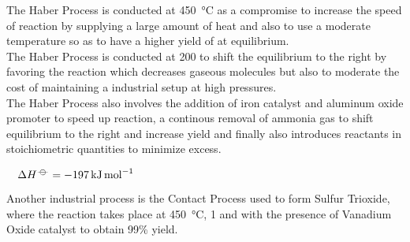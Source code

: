 \documentclass[../main]{subfiles}
\begin{document}
	The Haber Process is conducted at \SI{450}{\celsius} as a compromise to increase the speed of reaction by supplying a large amount of heat and also to use a moderate temperature so as to have a higher yield of  at equilibrium. \\

	The Haber Process is conducted at \SI{200}{\atm} to shift the equilibrium to the right by favoring the reaction which decreases gaseous molecules but also to moderate the cost of maintaining a industrial setup at high pressures. \\

	The Haber Process also involves the addition of iron catalyst and aluminum oxide promoter to speed up reaction, a continous removal of ammonia gas to shift equilibrium to the right and increase yield and finally also introduces reactants in stoichiometric quantities to minimize excess.

	\begin{center}  \(\quad \Delta H^\plimsoll = \SI{-197}{\kJ\per\mol}\) \end{center}

	Another industrial process is the Contact Process used to form Sulfur Trioxide, where the reaction takes place at \SI{450}{\celsius}, \SI{1}{\atm} and with the presence of Vanadium Oxide  catalyst to obtain 99\% yield.
\end{document}
